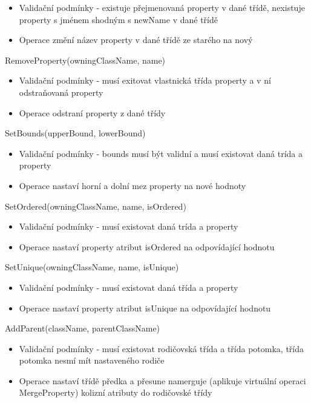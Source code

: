 \documentclass[11pt,twoside,a4paper]{book}
\begin{document}
\begin{list}{Operace :}{}
  \begin{itemize}
    \item Validační podmínky - existuje přejmenovaná property v dané třídě,
    nexistuje property s jménem shodným s newName v dané třídě 
    \item  Operace změní název property v dané třídě ze starého na nový
  \end{itemize}
  \item RemoveProperty(owningClassName, name)
  \begin{itemize}
    \item Validační podmínky - musí exitovat vlastnická třída property a v ní
    odstraňovaná property
    \item  Operace odstraní property z dané třídy
  \end{itemize}
  \item SetBounds(upperBound, lowerBound)
  \begin{itemize}
    \item Validační podmínky - bounds musí být validní a musí existovat daná
    trída a property
    \item  Operace nastaví horní a dolní mez property na nové hodnoty
  \end{itemize}
  \item SetOrdered(owningClassName, name, isOrdered)
  \begin{itemize}
    \item Validační podmínky - musí existovat daná trída a property
    \item  Operace nastaví property atribut isOrdered na odpovídající hodnotu
  \end{itemize}
  \item SetUnique(owningClassName, name, isUnique)
  \begin{itemize}
    \item Validační podmínky - musí existovat daná třída a property
    \item  Operace nastaví property atribut isUnique na odpovídající hodnotu
  \end{itemize}
  \item AddParent(className, parentClassName)
  \begin{itemize}
    \item Validační podmínky - musí existovat rodičovská třída a třída potomka,
    třída potomka nesmí mít nastaveného rodiče
    \item Operace nastaví třídě předka a přesune namerguje (aplikuje virtuální
    operaci MergeProperty) kolizní atributy do rodičovské třídy

\end{itemize}
\end{list}
\end{document}
